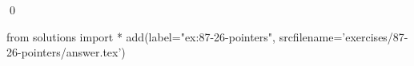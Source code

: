 
\begin{ex}
  \label{ex:87-26-pointers}
  
  \qed
\end{ex}
\begin{python0}
from solutions import *
add(label="ex:87-26-pointers",
    srcfilename='exercises/87-26-pointers/answer.tex')
\end{python0}
